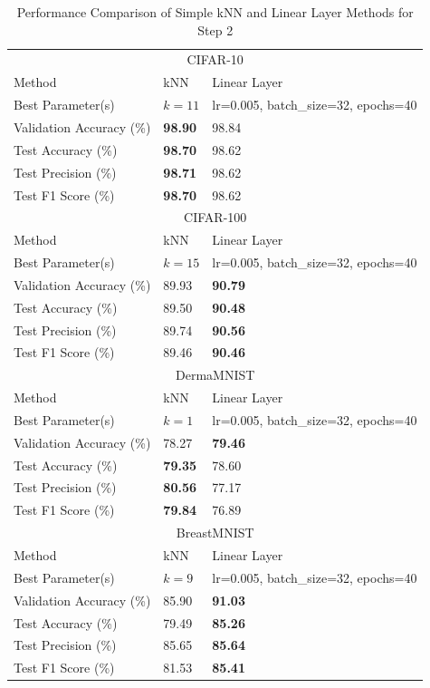 \documentclass[a4paper]{article}
\begin{document}
\begin{table}[ht]
  \caption{Performance Comparison of Simple kNN and Linear Layer Methods for Step 2}
  \label{tab:step2_results}
  \centering
  \begin{tabular}{lll}
    \toprule
    \multicolumn{3}{c}{CIFAR-10} \\
    \cmidrule(r){1-3}
    Method & kNN & Linear Layer \\
    \cmidrule(r){1-3}
    Best Parameter(s) & \( k = 11 \) & lr=0.005, batch\_size=32, epochs=40 \\
    Validation Accuracy (\%) & \textbf{98.90} & 98.84 \\
    Test Accuracy (\%) & \textbf{98.70} & 98.62 \\
    Test Precision (\%) & \textbf{98.71} & 98.62 \\
    Test F1 Score (\%) & \textbf{98.70} & 98.62 \\
    \midrule
    
    \multicolumn{3}{c}{CIFAR-100} \\
    \cmidrule(r){1-3}
    Method & kNN & Linear Layer \\
    \cmidrule(r){1-3}
    Best Parameter(s) & \( k = 15 \) & lr=0.005, batch\_size=32, epochs=40 \\
    Validation Accuracy (\%) & 89.93 & \textbf{90.79} \\
    Test Accuracy (\%) & 89.50 & \textbf{90.48} \\
    Test Precision (\%) & 89.74 & \textbf{90.56} \\
    Test F1 Score (\%) & 89.46 & \textbf{90.46} \\
    \midrule

    \multicolumn{3}{c}{DermaMNIST} \\
    \cmidrule(r){1-3}
    Method & kNN & Linear Layer \\
    \cmidrule(r){1-3}
    Best Parameter(s) & \( k = 1 \) & lr=0.005, batch\_size=32, epochs=40 \\
    Validation Accuracy (\%) & 78.27 & \textbf{79.46} \\
    Test Accuracy (\%) & \textbf{79.35} & 78.60 \\
    Test Precision (\%) & \textbf{80.56} & 77.17 \\
    Test F1 Score (\%) & \textbf{79.84} & 76.89 \\
    \midrule

    \multicolumn{3}{c}{BreastMNIST} \\
    \cmidrule(r){1-3}
    Method & kNN & Linear Layer \\
    \cmidrule(r){1-3}
    Best Parameter(s) & \( k = 9 \) & lr=0.005, batch\_size=32, epochs=40 \\
    Validation Accuracy (\%) & 85.90 & \textbf{91.03} \\
    Test Accuracy (\%) & 79.49 & \textbf{85.26} \\
    Test Precision (\%) & 85.65 & \textbf{85.64} \\
    Test F1 Score (\%) & 81.53 & \textbf{85.41} \\
    \bottomrule
  \end{tabular}
\end{table}
\end{document}
